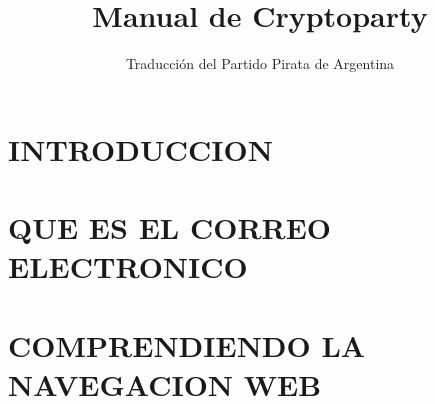 \documentclass[oribibl,oneside]{scrbook}
\begin{document}
\title{Manual de Cryptoparty}
\author{Traducción del Partido Pirata de Argentina}

\maketitle
\tableofcontents
\clearpage
\graphicspath{{./capitulo_01_INTRODUCCION/}}
\chapter{INTRODUCCION}
\clearpage

\clearpage

\clearpage

\clearpage

\clearpage

\clearpage

\graphicspath{{./capitulo_02_QUE_ES_EL_CORREO_ELECTRONICO/}}
\chapter{QUE ES EL CORREO ELECTRONICO}
\clearpage

\clearpage

\clearpage

\clearpage

\clearpage

\graphicspath{{./capitulo_03_COMPRENDIENDO_LA_NAVEGACION_WEB/}}
\chapter{COMPRENDIENDO LA NAVEGACION WEB}
\clearpage

\clearpage

\clearpage

\clearpage

\clearpage

\clearpage

\clearpage

\graphicspath{{./capitulo_04_PUBLICACION_Y_DISTRIBUCION/}}
\end{document}
